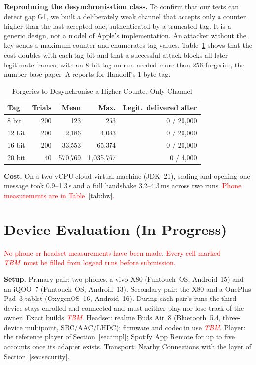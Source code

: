 \documentclass[conference]{IEEEtran}
\newcommand{\tbm}{\textcolor{red}{\textit{TBM}}}
\newcommand{\draftnote}[1]{\textcolor{red}{#1}}
\begin{document}
\textbf{Reproducing the desynchronisation class.} To confirm that our tests can detect gap G1, we built a deliberately weak channel that accepts only a counter higher than the last accepted one, authenticated by a truncated tag. It is a generic design, not a model of Apple's implementation. An attacker without the key sends a maximum counter and enumerates tag values. Table~\ref{tab:desync} shows that the cost doubles with each tag bit and that a successful attack blocks all later legitimate frames; with an 8-bit tag no run needed more than 256 forgeries, the number base paper~A reports for Handoff's 1-byte tag.

\begin{table}[t]
\caption{Forgeries to Desynchronise a Higher-Counter-Only Channel}
\label{tab:desync}
\centering
\footnotesize
\begin{tabular}{@{}lrrrr@{}}
\toprule
\textbf{Tag} & \textbf{Trials} & \textbf{Mean} & \textbf{Max.} & \textbf{Legit.\ delivered after} \\
\midrule
8 bit & 200 & 123 & 253 & 0 / 20{,}000 \\
12 bit & 200 & 2{,}186 & 4{,}083 & 0 / 20{,}000 \\
16 bit & 200 & 33{,}553 & 65{,}374 & 0 / 20{,}000 \\
20 bit & 40 & 570{,}769 & 1{,}035{,}767 & 0 / 4{,}000 \\
\bottomrule
\end{tabular}
\end{table}

\textbf{Cost.} On a two-vCPU cloud virtual machine (JDK~21), sealing and opening one message took 0.9--1.3\,\textmu s and a full handshake 3.2--4.3\,ms across two runs. \draftnote{Phone measurements are in Table~\ref{tab:hw}.}

\section{Device Evaluation (In Progress)}\label{sec:hw}

\draftnote{No phone or headset measurements have been made. Every cell marked \tbm\ must be filled from logged runs before submission.}

\textbf{Setup.} Primary pair: two phones, a vivo X80 (Funtouch~OS, Android~15) and an iQOO~7 (Funtouch~OS, Android~13). Secondary pair: the X80 and a OnePlus Pad~3 tablet (OxygenOS~16, Android~16). During each pair's runs the third device stays enrolled and connected and must neither play nor lose track of the owner. Exact builds \tbm. Headset: realme Buds Air~8 (Bluetooth~5.4, three-device multipoint, SBC/AAC/LHDC); firmware and codec in use \tbm. Player: the reference player of Section~\ref{sec:impl}; Spotify App Remote for up to five accounts once its adapter exists. Transport: Nearby Connections with the layer of Section~\ref{sec:security}.
\end{document}
